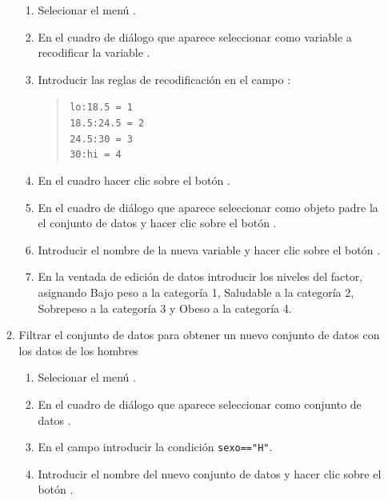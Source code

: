 \begin{enumerate}[leftmargin=*]
\begin{enumerate}
\begin{indicacion}
\begin{enumerate}
\item Selecionar el menú .
\item En el cuadro de diálogo que aparece seleccionar como variable a recodificar la variable .
\item Introducir las reglas de recodificación en el campo :
\begin{quote}
\lstinline{lo:18.5 = 1}\\
\lstinline{18.5:24.5 = 2}\\
\lstinline{24.5:30 = 3}\\
\lstinline{30:hi = 4}
\end{quote}
\item En el cuadro  hacer clic sobre el botón .
\item En el cuadro de diálogo que aparece seleccionar como objeto padre la el conjunto de datos  y hacer clic sobre el botón .
\item Introducir el nombre de la nueva variable  y hacer clic sobre el botón .
\item En la ventada de edición de datos introducir los niveles del factor, asignando Bajo peso a la categoría 1,
Saludable a la categoría 2, Sobrepeso a la categoría 3 y Obeso a la categoría 4. 
\end{enumerate}
\end{indicacion}


\item Filtrar el conjunto de datos para obtener un nuevo conjunto de datos con los datos de los hombres
\begin{indicacion}
\begin{enumerate}
\item Selecionar el menú .
\item En el cuadro de diálogo que aparece seleccionar como conjunto de datos .
\item En el campo  introducir la condición \lstinline{sexo=="H"}. 
\item Introducir el nombre del  nuevo conjunto de datos  y hacer clic sobre el botón .
\end{enumerate}
\end{indicacion}


\end{enumerate}
\end{enumerate}

